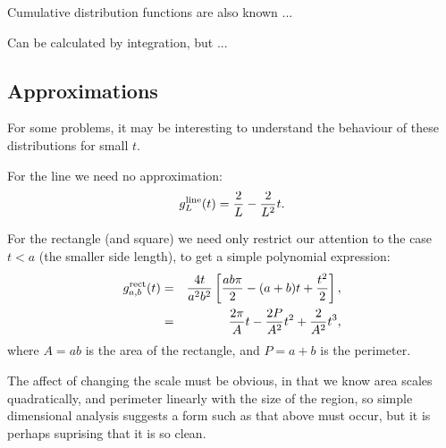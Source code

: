 \documentclass{article}
\begin{document}
Cumulative distribution functions are also known ...

Can be calculated by integration, but ...



\subsection{Approximations}

For some problems, it may be interesting to understand the behaviour
of these distributions for small $t$. 

For the line we need no approximation:
\begin{equation}
  \label{eq:line_line}
  g^{\rm line}_L(t) = \frac{2}{L} - \frac{2}{L^2} t.
\end{equation}

For the rectangle (and square) we need only restrict our attention to
the case $t<a$ (the smaller side length), to get a simple polynomial
expression: 
\begin{eqnarray}
  g^{\rm rect}_{a,b}(t) & = & 
           \frac{4 t}{a^2 b^2}  
         \left[ \frac{ab \pi}{2} - (a+b) t + \frac{t^2}{2} \right],
          \nonumber \\
                         & = & \frac{2 \pi}{A} t 
                              - \frac{2 P}{A^2} t^2
                              + \frac{2}{A^2} t^3,
\end{eqnarray}
where $A = ab$ is the area of the rectangle, and $P = a+b$ is the perimeter.

The affect of changing the scale must be obvious, in that we know area
scales quadratically, and perimeter linearly with the size of the
region, so simple dimensional analysis suggests a form such as that
above must occur, but it is perhaps suprising that it is so clean. 
\end{document}
